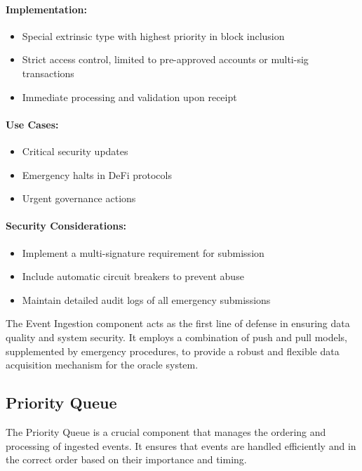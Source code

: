 \documentclass[12pt,a4paper]{article}
\begin{document}
	\paragraph{Implementation:}
	\begin{itemize}
		\item Special extrinsic type with highest priority in block inclusion
		\item Strict access control, limited to pre-approved accounts or multi-sig transactions
		\item Immediate processing and validation upon receipt
	\end{itemize}
	
	\paragraph{Use Cases:}
	\begin{itemize}
		\item Critical security updates
		\item Emergency halts in DeFi protocols
		\item Urgent governance actions
	\end{itemize}
	
	\paragraph{Security Considerations:}
	\begin{itemize}
		\item Implement a multi-signature requirement for submission
		\item Include automatic circuit breakers to prevent abuse
		\item Maintain detailed audit logs of all emergency submissions
	\end{itemize}
	
	The Event Ingestion component acts as the first line of defense in ensuring data quality and system security. It employs a combination of push and pull models, supplemented by emergency procedures, to provide a robust and flexible data acquisition mechanism for the oracle system.
	
	\subsection{Priority Queue}
	The Priority Queue is a crucial component that manages the ordering and processing of ingested events. It ensures that events are handled efficiently and in the correct order based on their importance and timing.
	
\end{document}
